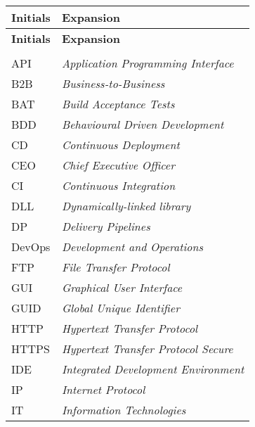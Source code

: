 
    \def\baselinestretch{1.15}
    \renewcommand{\arraystretch}{1.1}
    \setlength{\arrayrulewidth}{0.2mm}%
 
\begin{longtable}[c]{p{3cm} p{11cm}}
    \textbf{Initials} & \textbf{Expansion} \\
    \endfirsthead
    \textbf{Initials} & \textbf{Expansion} \\
    \endhead
    \endfoot
    \endlastfoot\\
    API & \textit {Application Programming Interface} \\
    B2B & \textit {Business-to-Business} \\
    BAT & \textit {Build Acceptance Tests} \\
    BDD & \emph{Behavioural Driven Development}  \\
    CD & \emph{Continuous Deployment}  \\
    CEO & \emph{Chief Executive Officer}  \\
    CI & \textit {Continuous Integration} \\
    DLL & \emph{Dynamically-linked library}  \\
    DP & \textit {Delivery Pipelines} \\
    DevOps & \textit{Development and Operations} \\
    FTP & \textit{File Transfer Protocol} \\
    GUI & \textit{Graphical User Interface} \\
    GUID & \textit{Global Unique Identifier} \\
    HTTP & \textit{Hypertext Transfer Protocol} \\
    HTTPS & \textit{Hypertext Transfer Protocol Secure} \\
    IDE & \textit{Integrated Development Environment}  \\
    IP & \textit{Internet Protocol} \\
    IT & \textit{Information Technologies} \\

\end{longtable}
